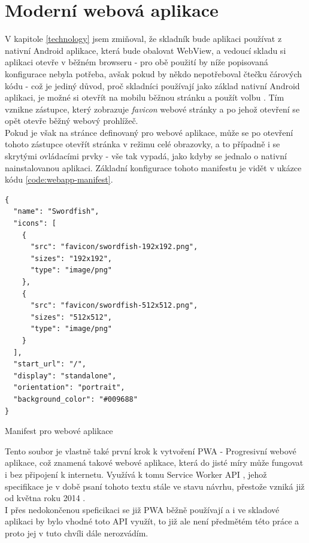 \section{Moderní webová aplikace}

V kapitole \ref{technology} jsem zmiňoval, že skladník bude aplikaci používat z nativní Android aplikace, která bude obalovat WebView, a vedoucí skladu si aplikaci otevře v běžném browseru - pro obě použití by níže popisovaná konfigurace nebyla potřeba, avšak pokud by někdo nepotřeboval čtečku čárových kódu - což je jediný důvod, proč skladníci používají jako základ nativní Android aplikaci, je možné si otevřít na mobilu běžnou stránku a použít volbu . Tím vznikne zástupce, který zobrazuje \emph{favicon} webové stránky a po jehož otevření se opět otevře běžný webový prohlížeč.\\
Pokud je však na stránce definovaný  pro webové aplikace, může se po otevření tohoto zástupce otevřít stránka v režimu celé obrazovky, a to případně i se skrytými ovládacími prvky - vše tak vypadá, jako kdyby se jednalo o nativní nainstalovanou aplikaci. Základní konfigurace tohoto manifestu je vidět v ukázce kódu \ref{code:webapp-manifest}.

\begin{listing}[H]
\begin{verbatim}
{
  "name": "Swordfish",
  "icons": [
    {
      "src": "favicon/swordfish-192x192.png",
      "sizes": "192x192",
      "type": "image/png"
    },
    {
      "src": "favicon/swordfish-512x512.png",
      "sizes": "512x512",
      "type": "image/png"
    }
  ],
  "start_url": "/",
  "display": "standalone",
  "orientation": "portrait",
  "background_color": "#009688"
}

\end{verbatim}
\caption{Manifest pro webové aplikace} \label{code:webapp-manifest}
\end{listing}

Tento soubor je vlastně také první krok k vytvoření PWA - Progresivní webové aplikace, což znamená takové webové aplikace, která do jisté míry může fungovat i bez připojení k internetu. Využívá k tomu Service Worker API \cite{service-worker-api}, jehož specifikace je v době psaní tohoto textu stále ve stavu návrhu, přestože vzniká již od května roku 2014 \cite{service-worker-first}.\\
I přes nedokončenou speficikaci se již PWA běžně používají a i ve skladové aplikaci by bylo vhodné toto API využít, to již ale není předmětém této práce a proto jej v tuto chvíli dále nerozvádím.

